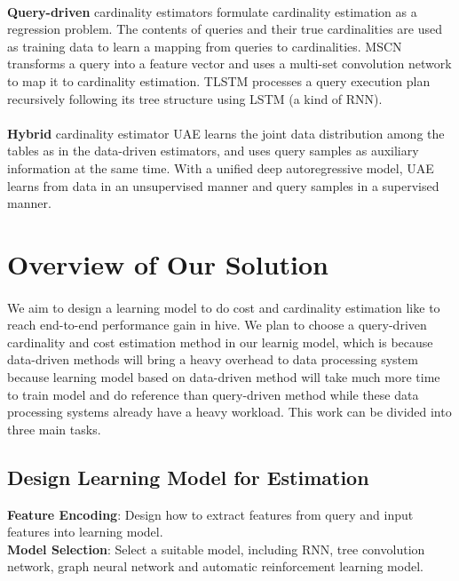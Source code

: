     \paragraph{}
    \textbf{Query-driven} cardinality estimators\cite{deeplearningmodel20,sun2019end} formulate cardinality estimation as a 
    regression problem. The contents of queries and their true cardinalities are used as training data to learn a 
    mapping from queries to cardinalities. MSCN\cite{kipf2018learned} transforms a query into a feature vector and 
    uses a multi-set convolution network to map it to cardinality estimation. TLSTM processes a query execution plan
    recursively following its tree structure using LSTM (a kind of RNN).
    \paragraph{}
    \textbf{Hybrid} cardinality estimator UAE\cite{wu2021unified} learns the joint data distribution among the tables as in 
    the data-driven estimators, and uses query samples as auxiliary information at the same time. With a unified deep 
    autoregressive model, UAE learns from data in an unsupervised manner and query samples in a supervised manner. 

\section{Overview of Our Solution}
    \paragraph{}
    We aim to design a learning model to do cost and cardinality estimation like \cite{sun2019end} to reach end-to-end performance gain 
    in hive\cite{Hive}. We plan to choose a query-driven cardinality and cost estimation method in our learnig model, which 
    is because data-driven methods will bring a heavy overhead to data processing system because learning model based on 
    data-driven method will take much more time to train model and do reference than query-driven method while these data 
    processing systems already have a heavy workload. This work can be divided into three main tasks.
    \subsection{Design Learning Model for Estimation}
    \textbf{Feature Encoding}: Design how to extract features from query and input features into learning model.\\
    \textbf{Model Selection}: Select a suitable model, including RNN, tree convolution network, graph neural network and 
    automatic reinforcement learning model.
